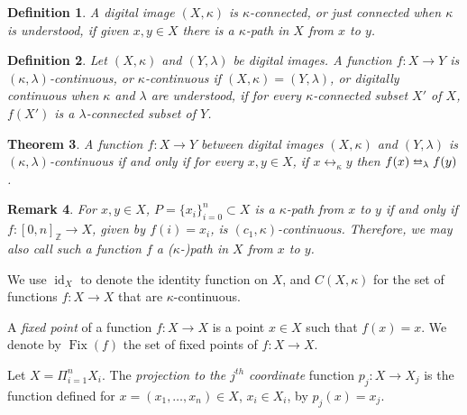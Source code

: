 \documentclass{article}
\newtheorem{thm}{Theorem}
\newtheorem{remarks}[thm]{Remark}
\newtheorem{definition}[thm]{Definition}
\numberwithin{thm}{section}
\newcommand{\adj}{\leftrightarrow}
\newcommand{\adjeq}{\leftrightarroweq}
\DeclareMathOperator{\id}{id}
\DeclareMathOperator{\Fix}{Fix}
\def\Z{{\mathbb Z}}
\begin{document}
\begin{definition}
{\rm \cite{Rosenfeld}}
A digital image $(X,\kappa)$ is
{\em $\kappa$-connected}, or just {\em connected} when
$\kappa$ is understood, if given $x,y \in X$ there
is a $\kappa$-path in $X$ from $x$ to $y$.
\end{definition}

\begin{definition}
{\rm \cite{Rosenfeld, Bx99}}
Let $(X,\kappa)$ and $(Y,\lambda)$ be digital
images. A function $f: X \to Y$ is 
{\em $(\kappa,\lambda)$-continuous}, or
{\em $\kappa$-continuous} if $(X,\kappa)=(Y,\lambda)$, or
{\em digitally continuous} when $\kappa$ and
$\lambda$ are understood, if for every
$\kappa$-connected subset $X'$ of $X$,
$f(X')$ is a $\lambda$-connected subset of $Y$.
\end{definition}

\begin{thm}
{\rm \cite{Bx99}}
A function $f: X \to Y$ between digital images
$(X,\kappa)$ and $(Y,\lambda)$ is
$(\kappa,\lambda)$-continuous if and only if for
every $x,y \in X$, if $x \adj_{\kappa} y$ then
$f(x) \adjeq_{\lambda} f(y)$.
\end{thm}

\begin{remarks}
    For $x,y \in X$, $P = \{x_i\}_{i=0}^n \subset X$
is a $\kappa$-path from $x$ to $y$ if and only if
$f: [0,n]_{\Z} \to X$, given by $f(i)=x_i$, is
$(c_1,\kappa)$-continuous. Therefore, we may also
call such a function $f$ a {\em ($\kappa$-)path}
in $X$ from $x$ to $y$.
\end{remarks}

We use $\id_X$ to denote the identity function on $X$, 
and $C(X,\kappa)$ for the set of functions 
$f: X \to X$ that are $\kappa$-continuous.

A {\em fixed point} of a function $f: X \to X$ 
is a point $x \in X$ such that $f(x) = x$. We denote by
$\Fix(f)$ the set of fixed points of $f: X \to X$.

Let $X = \Pi_{i=1}^n X_i$. The 
{\em projection to the
$j^{th}$ coordinate}
function $p_j: X \to X_j$
is the function defined
for $x = (x_1, \ldots, x_n) \in X$, $x_i \in X_i$, by $p_j(x) = x_j$.
\end{document}
